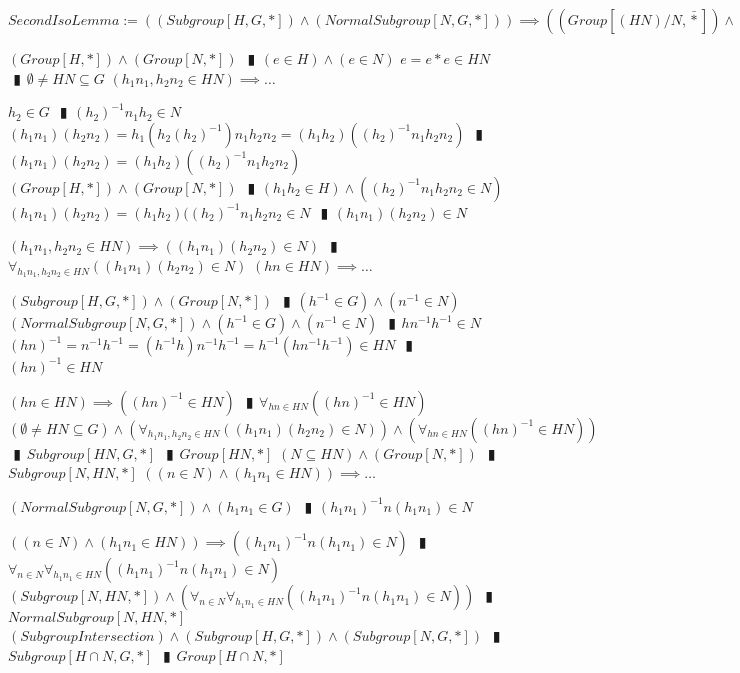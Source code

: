 \documentclass{book}
\newcommand{\abr}{:=}
\newcommand{\pipe}{$\phantom{(}\vrectangleblack\phantom{)}$}
\newcommand{\bbin}[1]{\mathbin{{\bar{#1}}}}
\begin{document}
$SecondIsoLemma \abr ((Subgroup[H, G, *]) \land (NormalSubgroup[N, G, *])) \implies ((Group[(H N) / N, \bbin{*}]) \land (Group[H / (H \cap N), \bbin{*}]))$
\begin{enumerate}
  \lit $(Group[H, *]) \land (Group[N, *])$ \pipe $(e \in H) \land (e \in N)$
  \lit $e = e * e \in H N$ \pipe $\emptyset \neq H N \subseteq G$
  \lit $(h_1 n_1, h_2 n_2 \in H N) \implies \ldots$
  \begin{enumerate}
    \lit $h_2 \in G$ \pipe $(h_2)^{-1} n_1 h_2 \in N$
    \lit $(h_1 n_1) (h_2 n_2) = h_1 (h_2 (h_2)^{-1}) n_1 h_2 n_2 = (h_1 h_2) ((h_2)^{-1} n_1 h_2 n_2)$ \pipe $(h_1 n_1) (h_2 n_2) = (h_1 h_2) ((h_2)^{-1} n_1 h_2 n_2)$
    \lit $(Group[H, *]) \land (Group[N, *])$ \pipe $(h_1 h_2 \in H) \land ((h_2)^{-1} n_1 h_2 n_2 \in N)$
    \lit $(h_1 n_1) (h_2 n_2) = (h_1 h_2) ((h_2)^{-1} n_1 h_2 n_2 \in N$ \pipe $(h_1 n_1) (h_2 n_2) \in N$
  \end{enumerate}
  \lit $(h_1 n_1, h_2 n_2 \in H N) \implies ((h_1 n_1) (h_2 n_2) \in N)$ \pipe $\forall_{h_1 n_1, h_2 n_2 \in H N}((h_1 n_1) (h_2 n_2) \in N)$
  \lit $(h n \in H N) \implies \ldots$
  \begin{enumerate}
    \lit $(Subgroup[H, G, *]) \land (Group[N, *])$ \pipe $(h^{-1} \in G) \land (n^{-1} \in N)$
    \lit $(NormalSubgroup[N, G, *]) \land (h^{-1} \in G) \land (n^{-1} \in N)$ \pipe  $h n^{-1} h^{-1} \in N$
    \lit $(h n)^{-1} = n^{-1} h^{-1} = (h^{-1} h) n^{-1} h^{-1} = h^{-1} (h n^{-1} h^{-1}) \in H N$ \pipe $(h n)^{-1} \in H N$
  \end{enumerate}
  \lit $(h n \in H N) \implies ((h n)^{-1} \in H N)$ \pipe $\forall_{h n \in H N}((h n)^{-1} \in H N)$
  \lit $(\emptyset \neq H N \subseteq G) \land (\forall_{h_1 n_1, h_2 n_2 \in H N}((h_1 n_1) (h_2 n_2) \in N)) \land (\forall_{h n \in H N}((h n)^{-1} \in H N))$ \pipe $Subgroup[H N, G, *]$ \pipe $Group[H N, *]$
  \lit $(N \subseteq H N) \land (Group[N, *])$ \pipe $Subgroup[N, H N, *]$
  \lit $((n \in N) \land (h_1 n_1 \in H N)) \implies \ldots$
  \begin{enumerate}
    \lit $(NormalSubgroup[N, G, *]) \land (h_1 n_1 \in G)$ \pipe $(h_1 n_1)^{-1} n (h_1 n_1) \in N$
  \end{enumerate}
  \lit $((n \in N) \land (h_1 n_1 \in H N)) \implies ((h_1 n_1)^{-1} n (h_1 n_1) \in N)$ \pipe $\forall_{n \in N} \forall_{h_1 n_1 \in H N}((h_1 n_1)^{-1} n (h_1 n_1) \in N)$
  \lit $(Subgroup[N, H N, *]) \land (\forall_{n \in N} \forall_{h_1 n_1 \in H N}((h_1 n_1)^{-1} n (h_1 n_1) \in N))$ \pipe $NormalSubgroup[N, H N, *]$
  \lit $(SubgroupIntersection) \land (Subgroup[H, G, *]) \land (Subgroup[N, G, *])$ \pipe $Subgroup[H \cap N, G, *]$ \pipe $Group[H \cap N, *]$

\end{enumerate}
\end{document}
